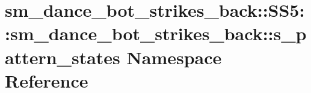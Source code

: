 \hypertarget{namespacesm__dance__bot__strikes__back_1_1SS5_1_1sm__dance__bot__strikes__back_1_1s__pattern__states}{}\section{sm\+\_\+dance\+\_\+bot\+\_\+strikes\+\_\+back\+:\+:S\+S5\+:\+:sm\+\_\+dance\+\_\+bot\+\_\+strikes\+\_\+back\+:\+:s\+\_\+pattern\+\_\+states Namespace Reference}
\label{namespacesm__dance__bot__strikes__back_1_1SS5_1_1sm__dance__bot__strikes__back_1_1s__pattern__states}
